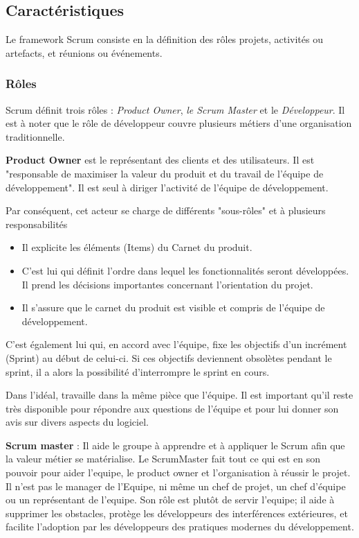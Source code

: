 \subsection{Caractéristiques}

Le framework Scrum consiste en la définition des rôles projets, activités ou artefacts, et réunions ou événements.

\subsubsection{Rôles}
Scrum définit trois rôles : \textit{Product Owner}, \textit{le Scrum Master} et le \textit{Développeur}. Il est à noter que le rôle de développeur couvre plusieurs métiers d'une organisation traditionnelle.

\begin{description}
    \item \textbf{Product Owner} est le représentant des clients et des utilisateurs. Il est "responsable de maximiser la valeur du produit et du travail de l'équipe de développement".  Il est seul à diriger l'activité de l'équipe de développement. 
    
    Par conséquent, cet acteur se charge de différents "sous-rôles" et à plusieurs responsabilités 
    \begin{itemize}
    \item Il explicite les éléments (Items) du Carnet du produit.
    \item C'est lui qui définit l'ordre dans lequel les fonctionnalités seront développées. Il prend les décisions importantes concernant l'orientation du projet.
    \item Il s'assure que le carnet du produit est visible et compris de l'équipe de développement.
    \end{itemize}
    
    C'est également lui qui, en accord avec l'équipe, fixe les objectifs d'un incrément (Sprint) au début de celui-ci. Si ces objectifs deviennent obsolètes pendant le sprint, il a alors la possibilité d'interrompre le sprint en cours.

Dans l'idéal, travaille dans la même pièce que l'équipe. Il est important qu'il reste très disponible pour répondre aux questions de l'équipe et pour lui donner son avis sur divers aspects du logiciel.

    \newpage
    
    \item \textbf{Scrum master} : Il aide le groupe à apprendre et à appliquer le Scrum afin que la valeur métier se
matérialise. Le ScrumMaster fait tout ce qui est en son pouvoir pour aider l’equipe, le product
owner et l’organisation à réussir le projet. Il n’est pas le manager de l’Equipe, ni
même un chef de projet, un chef d’équipe ou un représentant de l’equipe. Son rôle est plutôt de
servir l’equipe; il aide à supprimer les obstacles, protège les développeurs des interférences extérieures, et
facilite l’adoption par les développeurs des pratiques modernes du développement. 


\end{description}
